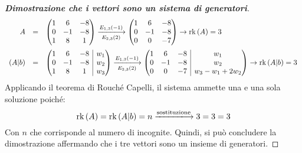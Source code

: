 \documentclass[a4paper]{article}
\makeatletter
\DeclareMathOperator{\rk}{rk}
\newenvironment{rowequmat}[1]{\left(\array{@{}#1@{}}}{\endarray\right)}
\makeatother
\begin{document}
\begin{proof}[\textbf{Dimostrazione che i vettori sono un sistema di generatori}]
		\begin{equation*}
				\begin{array}{rll}
					A &=& \begin{rowequmat}{ccc}
						1 &  6 & -8 \\
						0 & -1 & -8 \\
						1 &  8 &  1
					\end{rowequmat} \xlongrightarrow[E_{2,3}\left(2\right)]{E_{1,3}\left(-1\right)}
					\begin{rowequmat}{ccc}
						1 &  6 & -8 \\
						0 & -1 & -8 \\
						0 &  0 & -7
					\end{rowequmat} \rightarrow \rk\left(A\right) = 3 \\ [1.8em]
					\left(A|b\right) &=& \begin{rowequmat}{ccc|c}
						1 &  6 & -8 & w_{1} \\
						0 & -1 & -8 & w_{2} \\
						1 &  8 &  1 & w_{3}
					\end{rowequmat} \xlongrightarrow[E_{2,3}\left(2\right)]{E_{1,3}\left(-1\right)}
					\begin{rowequmat}{ccc|c}
						1 &  6 & -8 & w_{1} \\
						0 & -1 & -8 & w_{2} \\
						0 &  0 & -7 & w_{3} - w_{1} + 2w_{2}
					\end{rowequmat} \rightarrow \rk\left(A|b\right) = 3
				\end{array}
		\end{equation*}
		Applicando il teorema di Rouché Capelli, il sistema ammette una e una sola soluzione poiché:
		\begin{equation*}
			\rk\left(A\right) = \rk\left(A|b\right) = n \xlongrightarrow{\text{sostituzione}} 3 = 3 = 3
		\end{equation*}
		Con $n$ che corrisponde al numero di incognite. Quindi, si può concludere la dimostrazione affermando che i tre vettori sono un insieme di generatori.
	\end{proof}\newpage
	
\end{document}
